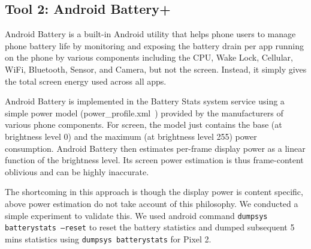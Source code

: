 \subsection{Tool 2: Android Battery+}
\label{subsec:tool2}

%    
%     

Android Battery is a built-in Android utility that helps phone users to
manage phone battery life by monitoring and exposing the battery drain
per app running on the phone by various components including the CPU,
Wake Lock, Cellular, WiFi, Bluetooth, Sensor, and Camera, but not the
screen. Instead, it simply gives the total screen energy used across
all apps.

Android Battery is implemented in the Battery Stats system service using a simple power model
(power\_profile.xml~\cite{AOSPPowerProfile}) provided by the
manufacturers of various phone components. For screen, the model just
contains the base (at brightness level 0) and the maximum (at brightness level 255) power
consumption. Android Battery then estimates
  per-frame display power as a linear function of the brightness level.
  Its screen power estimation is thus frame-content oblivious and can be highly
  inaccurate.

The shortcoming in this approach is though the display power is content 
specific, above power estimation do not take account of this philosophy.
We conducted a simple experiment to validate this. We used android command
{\small \tt dumpsys batterystats --reset} to reset the battery statistics and
dumped subsequent 5 mins statistics using {\small \tt dumpsys batterystats} for Pixel 2.

